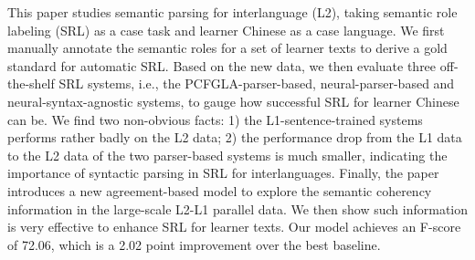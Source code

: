 This paper studies semantic parsing for interlanguage (L2), taking semantic role labeling (SRL) as a case task and learner Chinese as a case language. We first manually annotate the semantic roles for a set of learner texts to derive a gold standard for automatic SRL. Based on the new data, we then evaluate three off-the-shelf SRL systems, i.e., the PCFGLA-parser-based, neural-parser-based and neural-syntax-agnostic systems, to gauge how successful SRL for learner Chinese can be. We find two non-obvious facts: 1) the L1-sentence-trained systems performs rather badly on the L2 data; 2) the performance drop from the L1 data to the L2 data of the two parser-based systems is much smaller, indicating the importance of syntactic parsing in SRL for interlanguages. Finally, the paper introduces a new agreement-based model to explore the semantic coherency information in the large-scale L2-L1 parallel data. We then show such information is very effective to enhance SRL for learner texts. Our model achieves an F-score of 72.06, which is a 2.02 point improvement over the best baseline.
